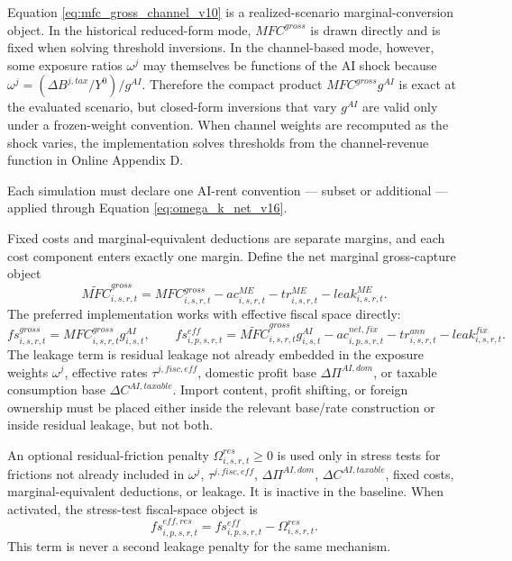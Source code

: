 \documentclass[11pt,a4paper]{article}
\begin{document}
Equation \eqref{eq:mfc_gross_channel_v10} is a realized-scenario marginal-conversion object. In the historical reduced-form mode, $MFC^{gross}$ is drawn directly and is fixed when solving threshold inversions. In the channel-based mode, however, some exposure ratios $\omega^j$ may themselves be functions of the AI shock because $\omega^j=(\Delta B^{j,tax}/Y^0)/g^{AI}$. Therefore the compact product $MFC^{gross}g^{AI}$ is exact at the evaluated scenario, but closed-form inversions that vary $g^{AI}$ are valid only under a frozen-weight convention. When channel weights are recomputed as the shock varies, the implementation solves thresholds from the channel-revenue function in Online Appendix D.

Each simulation must declare one AI-rent convention --- subset or additional --- applied through Equation \eqref{eq:omega_k_net_v16}.

Fixed costs and marginal-equivalent deductions are separate margins, and each cost component enters exactly one margin. Define the net marginal gross-capture object
\begin{equation}\label{eq:mfc_tilde_v17}
    \widetilde{MFC}^{gross}_{i,s,r,t}
    =MFC^{gross}_{i,s,r,t}-ac^{ME}_{i,s,r,t}-tr^{ME}_{i,s,r,t}-leak^{ME}_{i,s,r,t}.
\end{equation}
The preferred implementation works with effective fiscal space directly:
\begin{equation}\label{eq:fs_gross_eff_v21}
    fs^{gross}_{i,s,r,t}=MFC^{gross}_{i,s,r,t}g^{AI}_{i,s,t},
    \qquad
    fs^{eff}_{i,p,s,r,t}=\widetilde{MFC}^{gross}_{i,s,r,t}g^{AI}_{i,s,t}
    -ac^{net,fix}_{i,p,s,r,t}-tr^{ann}_{i,s,r,t}-leak^{fix}_{i,s,r,t}.
\end{equation}
The leakage term is residual leakage not already embedded in the exposure weights $\omega^j$, effective rates $\tau^{j,fisc,eff}$, domestic profit base $\Delta\Pi^{AI,dom}$, or taxable consumption base $\Delta C^{AI,taxable}$. Import content, profit shifting, or foreign ownership must be placed either inside the relevant base/rate construction or inside residual leakage, but not both.

An optional residual-friction penalty $\Omega^{res}_{i,s,r,t}\geq0$ is used only in stress tests for frictions not already included in $\omega^j$, $\tau^{j,fisc,eff}$, $\Delta\Pi^{AI,dom}$, $\Delta C^{AI,taxable}$, fixed costs, marginal-equivalent deductions, or leakage. It is inactive in the baseline. When activated, the stress-test fiscal-space object is
\begin{equation}\label{eq:omega_res_stress_v17}
    fs^{eff,res}_{i,p,s,r,t}=fs^{eff}_{i,p,s,r,t}-\Omega^{res}_{i,s,r,t}.
\end{equation}
This term is never a second leakage penalty for the same mechanism.
\end{document}
